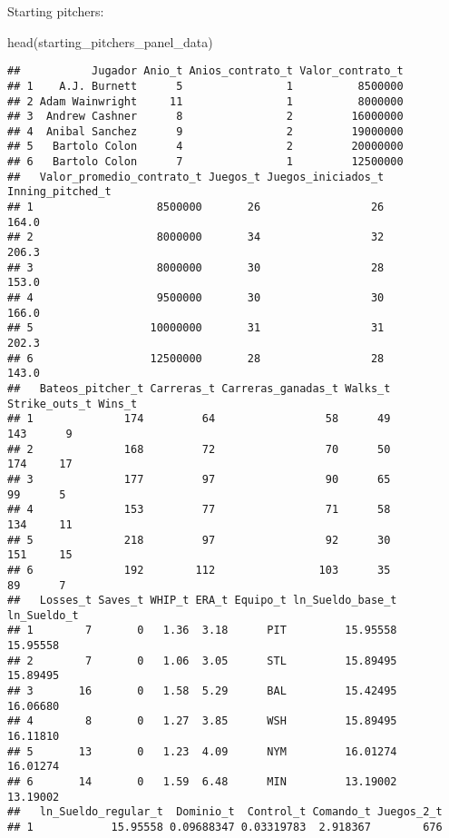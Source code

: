 \documentclass[
]{article}
\newenvironment{Shaded}{\begin{snugshade}}{\end{snugshade}}
\newcommand{\FunctionTok}[1]{\textcolor[rgb]{0.00,0.00,0.00}{#1}}
\newcommand{\NormalTok}[1]{#1}
\begin{document}
Starting pitchers:

\begin{Shaded}
\begin{Highlighting}[]
\FunctionTok{head}\NormalTok{(starting\_pitchers\_panel\_data)}
\end{Highlighting}
\end{Shaded}

\begin{verbatim}
##           Jugador Anio_t Anios_contrato_t Valor_contrato_t
## 1    A.J. Burnett      5                1          8500000
## 2 Adam Wainwright     11                1          8000000
## 3  Andrew Cashner      8                2         16000000
## 4  Anibal Sanchez      9                2         19000000
## 5   Bartolo Colon      4                2         20000000
## 6   Bartolo Colon      7                1         12500000
##   Valor_promedio_contrato_t Juegos_t Juegos_iniciados_t Inning_pitched_t
## 1                   8500000       26                 26            164.0
## 2                   8000000       34                 32            206.3
## 3                   8000000       30                 28            153.0
## 4                   9500000       30                 30            166.0
## 5                  10000000       31                 31            202.3
## 6                  12500000       28                 28            143.0
##   Bateos_pitcher_t Carreras_t Carreras_ganadas_t Walks_t Strike_outs_t Wins_t
## 1              174         64                 58      49           143      9
## 2              168         72                 70      50           174     17
## 3              177         97                 90      65            99      5
## 4              153         77                 71      58           134     11
## 5              218         97                 92      30           151     15
## 6              192        112                103      35            89      7
##   Losses_t Saves_t WHIP_t ERA_t Equipo_t ln_Sueldo_base_t ln_Sueldo_t
## 1        7       0   1.36  3.18      PIT         15.95558    15.95558
## 2        7       0   1.06  3.05      STL         15.89495    15.89495
## 3       16       0   1.58  5.29      BAL         15.42495    16.06680
## 4        8       0   1.27  3.85      WSH         15.89495    16.11810
## 5       13       0   1.23  4.09      NYM         16.01274    16.01274
## 6       14       0   1.59  6.48      MIN         13.19002    13.19002
##   ln_Sueldo_regular_t  Dominio_t  Control_t Comando_t Juegos_2_t
## 1            15.95558 0.09688347 0.03319783  2.918367        676

\end{verbatim}
\end{document}
